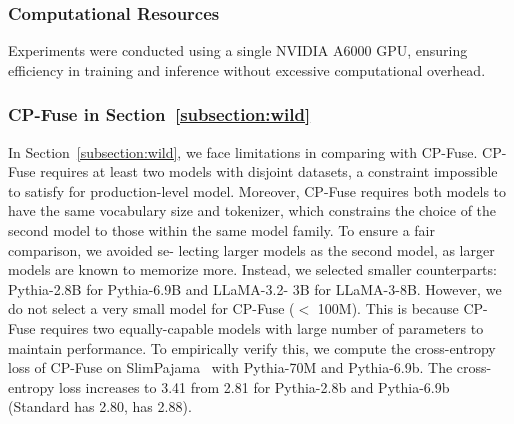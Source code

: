 \subsubsection{Computational Resources}
Experiments were conducted using a single NVIDIA A6000 GPU, ensuring efficiency in training and inference without excessive computational overhead.

\subsubsection{CP-Fuse in Section~\ref{subsection:wild}}
In Section~\ref{subsection:wild}, we face limitations in comparing with CP-Fuse. CP-Fuse requires at least two models with disjoint datasets, a constraint impossible to satisfy for production-level model. Moreover, CP-Fuse requires both models to have
the same vocabulary size and tokenizer, which constrains
the choice of the second model to those within the same
model family. To ensure a fair comparison, we avoided se-
lecting larger models as the second model, as larger models
are known to memorize more. Instead, we selected smaller
counterparts: Pythia-2.8B for Pythia-6.9B and LLaMA-3.2-
3B for LLaMA-3-8B. However, we do not select a very small model for CP-Fuse (\(<\) 100M). This is because CP-Fuse requires two equally-capable models with large number of parameters to maintain performance. To empirically verify this, we compute the cross-entropy loss of CP-Fuse on SlimPajama~\citep{soboleva2023slimpajama} with Pythia-70M and Pythia-6.9b. The cross-entropy loss increases to 3.41 from 2.81 for Pythia-2.8b and Pythia-6.9b (Standard has 2.80, \sys has 2.88).




